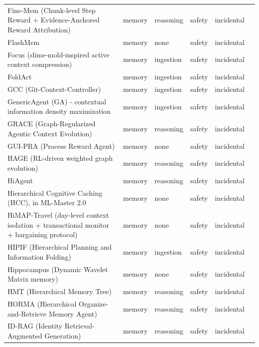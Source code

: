 \begin{longtable}{@{}p{}lllll@{}}
Fine-Mem (Chunk-level Step Reward + Evidence-Anchored Reward Attribution) & memory & reasoning & safety & incidental & \cite{ma-2026-finemem} \\
FlashMem & memory & none & safety & incidental & \cite{hou-2026-flashmem} \\
Focus (slime-mold-inspired active context compression) & memory & ingestion & safety & incidental & \cite{verma-2026-active} \\
FoldAct & memory & ingestion & safety & incidental & \cite{shao-2025-foldact} \\
GCC (Git-Context-Controller) & memory & ingestion & safety & incidental & \cite{wu-2025-git} \\
GenericAgent (GA) - contextual information density maximization & memory & ingestion & safety & incidental & \cite{liang-2026-genericagent} \\
GRACE (Graph-Regularized Agentic Context Evolution) & memory & reasoning & safety & incidental & \cite{hsu-2026-scoped} \\
GUI-PRA (Process Reward Agent) & memory & none & safety & incidental & \cite{xiong-2025-guipra} \\
HAGE (RL-driven weighted graph evolution) & memory & reasoning & safety & incidental & \cite{jiang-2026-hage} \\
HiAgent & memory & reasoning & safety & incidental & \cite{hu-2024-hiagent} \\
Hierarchical Cognitive Caching (HCC), in ML-Master 2.0 & memory & none & safety & incidental & \cite{zhu-2026-ultralonghorizon} \\
HiMAP-Travel (day-level context isolation + transactional monitor + bargaining protocol) & memory & none & safety & incidental & \cite{bui-2026-himaptravel} \\
HIPIF (Hierarchical Planning and Information Folding) & memory & ingestion & safety & incidental & \cite{diao-2026-hipif} \\
Hippocampus (Dynamic Wavelet Matrix memory) & memory & none & safety & incidental & \cite{li-2026-hippocampus} \\
HMT (Hierarchical Memory Tree) & memory & reasoning & safety & incidental & \cite{tan-2026-enhancing} \\
HORMA (Hierarchical Organize-and-Retrieve Memory Agent) & memory & reasoning & safety & incidental & \cite{hsu-2026-organize} \\
ID-RAG (Identity Retrieval-Augmented Generation) & memory & reasoning & safety & incidental & \cite{platnick-2025-idrag} \\

\end{longtable}
